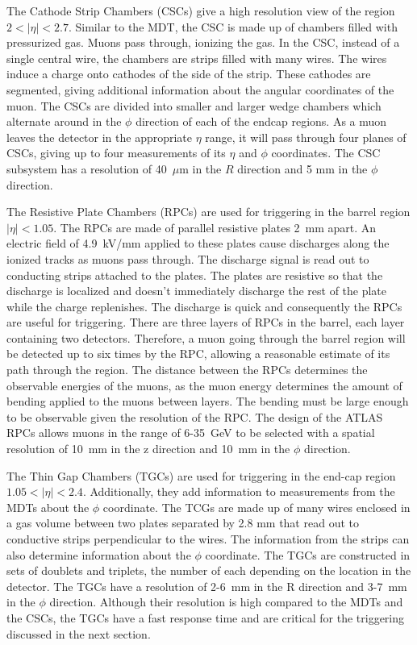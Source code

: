 The Cathode Strip Chambers (CSCs) give a high resolution view of the region \mbox{$2 < \left|\eta\right| < 2.7$}. Similar to the MDT, the CSC is made up of chambers filled with pressurized gas. Muons pass through, ionizing the gas. In the CSC, instead of a single central wire, the chambers are strips filled with many wires. The wires induce a charge onto cathodes of the side of the strip. These cathodes are segmented, giving additional information about the angular coordinates of the muon. The CSCs are divided into smaller and larger wedge chambers which alternate around in the $\phi$ direction of each of the endcap regions. As a muon leaves the detector in the appropriate $\eta$ range, it will pass through four planes of CSCs, giving up to four measurements of its $\eta$ and $\phi$ coordinates. The CSC subsystem has a resolution of \mbox{40 $\mu$m} in the $R$ direction and 5 mm in the $\phi$ direction.

The Resistive Plate Chambers (RPCs) are used for triggering in the barrel region \mbox{$\left|\eta\right| < 1.05$}. The RPCs are made of parallel resistive plates \mbox{2 mm} apart. An electric field of \mbox{4.9 kV/mm} applied to these plates cause discharges along the ionized tracks as muons pass through. The discharge signal is read out to conducting strips attached to the plates. The plates are resistive so that the discharge is localized and doesn't immediately discharge the rest of the plate while the charge replenishes. The discharge is quick and consequently the RPCs are useful for triggering. There are three layers of RPCs in the barrel, each layer containing two detectors. Therefore, a muon going through the barrel region will be detected up to six times by the RPC, allowing a reasonable estimate of its path through the region. The distance between the RPCs determines the observable energies of the muons, as the muon energy determines the amount of bending applied to the muons between layers. The bending must be large enough to be observable given the resolution of the RPC. The design of the ATLAS RPCs allows muons in the range of \mbox{6-35 GeV} to be selected with a spatial resolution of \mbox{10 mm} in the z direction and \mbox{10 mm} in the $\phi$ direction.

The Thin Gap Chambers (TGCs) are used for triggering in the end-cap region \mbox{$1.05 < \left|\eta\right| <2.4$}. Additionally, they add information to measurements from the MDTs about the $\phi$ coordinate. The TCGs are made up of many wires enclosed in a gas volume between two plates separated by 2.8 mm that read out to conductive strips perpendicular to the wires. The information from the strips can also determine information about the $\phi$ coordinate. The TGCs are constructed in sets of doublets and triplets, the number of each depending on the location in the detector. The TGCs have a resolution of \mbox{2-6 mm} in the R direction and \mbox{3-7 mm} in the $\phi$ direction. Although their resolution is high compared to the MDTs and the CSCs, the TGCs have a fast response time and are critical for the triggering discussed in the next section.


